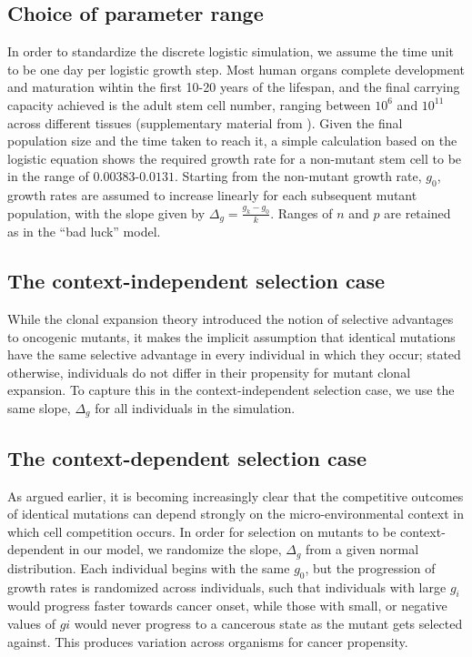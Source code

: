 \documentclass[12pt,onecolumn,twoside]{article}
\begin{document}
	\subsection{Choice of parameter range}
	In order to standardize the discrete logistic simulation, we assume the time unit to be one day per logistic growth step. Most human organs complete development and maturation wihtin the first 10-20 years of the lifespan, and the final carrying capacity achieved is the adult stem cell number, ranging between $10^{6}$ and $10^{11}$ across different tissues (supplementary material from \autocite{Tomasetti78}). Given the final population size and the time taken to reach it, a simple calculation based on the logistic equation shows the required growth rate for a non-mutant stem cell to be in the range of $0.00383$-$0.0131$. Starting from the non-mutant growth rate, $g_{0}$, growth rates are assumed to increase linearly for each subsequent mutant population, with the slope given by $\Delta_{g}=\frac{g_{k}-g_{0}}{k}$. Ranges of $n$ and $p$ are retained as in the ``bad luck'' model.

	\subsection{The context-independent selection case}
	While the clonal expansion theory introduced the notion of selective advantages to oncogenic mutants, it makes the implicit assumption that identical mutations have the same selective advantage in every individual in which they occur; stated otherwise, individuals do not differ in their propensity for mutant clonal expansion. To capture this in the context-independent selection case, we use the same slope, $\Delta_{g}$ for all individuals in the simulation.

	\subsection{The context-dependent selection case}
	As argued earlier, it is becoming increasingly clear that the competitive outcomes of identical mutations can depend strongly on the micro-environmental context in which cell competition occurs. In order for selection on mutants to be context-dependent in our model, we randomize the slope, $\Delta_{g}$ from a given normal distribution. Each individual begins with the same $g_{0}$, but the progression of growth rates is randomized across individuals, such that individuals with large $g_{i}$ would progress faster towards cancer onset, while those with small, or negative values of $g{i}$ would never progress to a cancerous state as the mutant gets selected against. This produces variation across organisms for cancer propensity.
\end{document}
